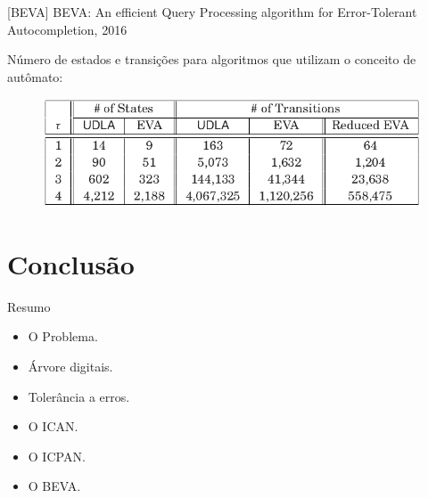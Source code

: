 \documentclass[11pt]{beamer}
\begin{document}
\begin{frame}{[BEVA] BEVA: An efficient Query Processing algorithm for Error-Tolerant Autocompletion, 2016}

    Número de estados e transições para algoritmos que utilizam o conceito de autômato:
    
    \begin{figure}
      \includegraphics[scale=0.40]{pictures/automata_size_beva.png}
      \centering
    \end{figure}
   
\end{frame}

\section{Conclusão}

\begin{frame}{Resumo}

    \begin{itemize}
        \item O Problema.
        \item Árvore digitais.
        \item Tolerância a erros.
        \item O ICAN.
        \item O ICPAN.
        \item O BEVA.
    \end{itemize}
    
\end{frame}
\end{document}

